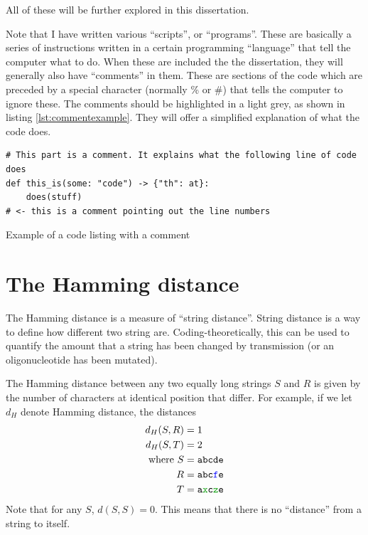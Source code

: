 \documentclass[11pt]{article}
\newenvironment{longlisting}
{\addvspace{\baselineskip}\captionsetup{type=listing}}
{\addvspace{\baselineskip}}
\begin{document}
    All of these will be further explored in this dissertation.

    Note that I have written various ``scripts'', or ``programs''. These are
    basically a series of instructions written in a certain programming
    ``language'' that tell the computer what to do. When these are included the
    the dissertation, they will generally also have ``comments'' in them. These
    are sections of the code which are preceded by a special character (normally
    \% or \#) that tells the computer to ignore these. The comments should be
    highlighted in a light grey, as shown in listing \ref{lst:commentexample}.
    They will offer a simplified explanation of what the code does.

\begin{longlisting}
\begin{verbatim}
# This part is a comment. It explains what the following line of code does
def this_is(some: "code") -> {"th": at}:
    does(stuff)
# <- this is a comment pointing out the line numbers
\end{verbatim}
\caption{Example of a code listing with a comment}\label{lst:commentexample}
\end{longlisting}

    \section{The Hamming distance}

    The Hamming distance is a measure of ``string distance''. String
    distance is a way to define how different two string are.
    Coding-theoretically, this can be used to quantify the amount that a
    string has been changed by transmission (or an oligonucleotide has been
    mutated).

    The Hamming distance between any two equally long strings $S$ and $R$
    is given by the number of characters at identical position that differ.
    For example, if we let $d_H$ denote Hamming distance, the distances
    \begin{align*}
    d_H(S, R) &= 1\\
    d_H(S, T) &= 2\\
    \text{where}\
    S &= \texttt{abcde}\\
    R &= \texttt{abc\textcolor{blue}{f}e}\\
    T &= \texttt{a\textcolor{codegreen}{x}c\textcolor{codegreen}{z}e}
    \end{align*}
    Note that for any $S$, $d(S, S) = 0$. This means that there is no
    ``distance'' from a string to itself.
\end{document}
